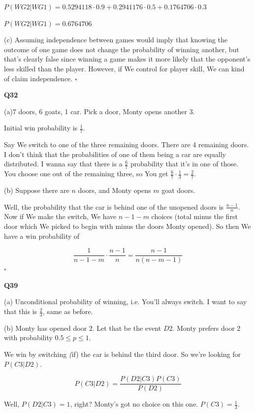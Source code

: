 \documentclass{article}
\newcommand{\qed}{\hfill$\square$}
\begin{document}
			$P(WG2\vert WG1) = 0.5294118\cdot 0.9 + 0.2941176\cdot 0.5 + 0.1764706\cdot 0.3$
			
			$P(WG2\vert WG1) = 0.6764706 $
			
			(c) Assuming independence between games would imply that knowing the outcome of one game does not change the probability of winning another, but that's clearly false since winning a game makes it more likely that the opponent's less skilled than the player. However, if We control for player skill, We can kind of claim independence. \qed
			
			\hfill
			
		\textbf{Q32}
			
			(a)7 doors, 6 goats, 1 car. Pick a door, Monty opens another 3.
				
			Initial win probability is $\frac{1}{7}$.
				
			Say We switch to one of the three remaining doors. There are 4 remaining doors. I don't think that the probabilities of one of them being a car are equally distributed. I wanna say that there is a $\frac{6}{7}$ probability that it's in one of those. You choose one out of the remaining three, so You get $\frac{6}{7} \cdot \frac{1}{3} = \frac{2}{7}$.
				
			(b) Suppose there are $n$ doors, and Monty opens $m$ goat doors.
				
			Well, the probability that the car is behind one of the unopened doors is $\frac{n-1}{n}$. Now if We make the switch, We have $n-1-m$ choices (total minus the first door which We picked to begin with minus the doors Monty opened). So then We have a win probability of
				
			$$\frac{1}{n-1-m}\cdot\frac{n-1}{n} = \frac{n-1}{n(n-m-1)}$$\qed
				
			\hfill 
				
		\textbf{Q39}
		
			(a) Unconditional probability of winning, i.e. You'll always switch. I want to say that this is $\frac{2}{3}$, same as before. 
			
			(b) Monty has opened door 2. Let that be the event $D2$. Monty prefers door 2 with probability $0.5 \leq p \leq 1$.
			
			We win by switching \textit(if) the car is behind the third door. So we're looking for $P(C3\vert D2)$.
			
			$$P(C3\vert D2) = \frac{P(D2\vert C3)P(C3)}{P(D2)}$$
			
			Well, $P(D2\vert C3) = 1$, right? Monty's got no choice on this one. $P(C3) = \frac{1}{3}$.
			
\end{document}
